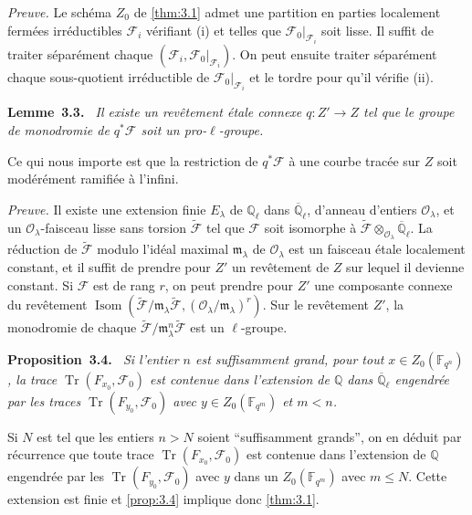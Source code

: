 \documentclass[11pt,a4paper]{article}
\makeatletter
\theoremstyle{plain}
\theoremstyle{definition}
\newenvironment{manualblock}[4]{%
  \par\medskip\noindent\textbf{#1~#2#3.}\def\@currentlabel{#2}\label{#4}\itshape\ }{\par\normalfont\medskip}
\DeclareMathOperator{\tr}{Tr}
\DeclareMathOperator{\Isom}{Isom}
\makeatother
\begin{document}
\noindent\textit{Preuve.} Le sch\'ema $Z_0$ de \ref{thm:3.1} admet une partition en parties localement ferm\'ees irr\'eductibles $\mathcal{F}_i$ v\'erifiant (i) et telles que $\mathcal{F}_0|_{\mathcal{F}_i}$ soit lisse. Il suffit de traiter s\'epar\'ement chaque $(\mathcal{F}_i, \mathcal{F}_0|_{\mathcal{F}_i})$. On peut ensuite traiter s\'epar\'ement chaque sous-quotient irr\'eductible de $\mathcal{F}_0|_{\mathcal{F}_i}$ et le tordre pour qu'il v\'erifie (ii).

\begin{manualblock}{Lemme}{3.3}{}{lem:3.3}
Il existe un rev\^etement \'etale connexe $q: Z' \to Z$ tel que le groupe de monodromie de $q^*\mathcal{F}$ soit un pro-$\ell$-groupe.
\end{manualblock}

Ce qui nous importe est que la restriction de $q^*\mathcal{F}$ \`a une courbe trac\'ee sur $Z$ soit mod\'er\'ement ramifi\'ee \`a l'infini.

\noindent\textit{Preuve.} Il existe une extension finie $E_\lambda$ de $\mathbb{Q}_\ell$ dans $\overline{\mathbb{Q}}_\ell$, d'anneau d'entiers $\mathcal{O}_\lambda$, et un $\mathcal{O}_\lambda$-faisceau lisse sans torsion $\tilde{\mathcal{F}}$ tel que $\mathcal{F}$ soit isomorphe \`a $\tilde{\mathcal{F}} \otimes_{\mathcal{O}_\lambda} \overline{\mathbb{Q}}_\ell$. La r\'eduction de $\tilde{\mathcal{F}}$ modulo l'id\'eal maximal $\mathfrak{m}_\lambda$ de $\mathcal{O}_\lambda$ est un faisceau \'etale localement constant, et il suffit de prendre pour $Z'$ un rev\^etement de $Z$ sur lequel il devienne constant. Si $\mathcal{F}$ est de rang $r$, on peut prendre pour $Z'$ une composante connexe du rev\^etement $\Isom(\tilde{\mathcal{F}}/\mathfrak{m}_\lambda\tilde{\mathcal{F}}, (\mathcal{O}_\lambda/\mathfrak{m}_\lambda)^r)$. Sur le rev\^etement $Z'$, la monodromie de chaque $\tilde{\mathcal{F}}/\mathfrak{m}_\lambda^n\tilde{\mathcal{F}}$ est un $\ell$-groupe.

\begin{manualblock}{Proposition}{3.4}{}{prop:3.4}
Si l'entier $n$ est suffisamment grand, pour tout $x \in Z_0(\mathbb{F}_{q^n})$, la trace $\tr(F_{x_0}, \mathcal{F}_0)$ est contenue dans l'extension de $\mathbb{Q}$ dans $\overline{\mathbb{Q}}_\ell$ engendr\'ee par les traces $\tr(F_{y_0}, \mathcal{F}_0)$ avec $y \in Z_0(\mathbb{F}_{q^m})$ et $m < n$.
\end{manualblock}

Si $N$ est tel que les entiers $n > N$ soient ``suffisamment grands'', on en d\'eduit par r\'ecurrence que toute trace $\tr(F_{x_0}, \mathcal{F}_0)$ est contenue dans l'extension de $\mathbb{Q}$ engendr\'ee par les $\tr(F_{y_0}, \mathcal{F}_0)$ avec $y$ dans un $Z_0(\mathbb{F}_{q^m})$ avec $m \leq N$. Cette extension est finie et \ref{prop:3.4} implique donc \ref{thm:3.1}.
\end{document}

